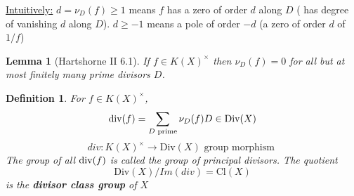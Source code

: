 \documentclass[11pt]{article}
\newtheorem{lemma}[thm]{Lemma}
\newtheorem{dfn}[thm]{Definition}
\renewcommand{\div}{\textnormal{div}}
\newcommand{\lrta}{\longrightarrow}
\begin{document}
\underline{Intuitively:}
$d=\nu_D(f)\geq 1$ means $f$ has a zero of order $d$ along $D$ ( has degree of vanishing $d$ along $D$). $d\geq -1$ means a pole of order $-d$ (a zero of order $d$ of $1/f$)



\begin{lemma}[Hartshorne II 6.1] If $f\in K(X)^\times$ then $\nu_D(f)=0$ for all but at most finitely many prime divisors $D$.
\end{lemma}
\begin{dfn}
For 
$f\in K(X)^\times$,
$$
\div(f)=\sum_{D\text{ prime}} \nu_D(f) D \in \text{Div}(X)
$$
$$
div:K(X)^\times\lrta \text{Div}(X)\text{ group morphism }
$$
The group of all $\div(f) $ is called the group of principal divisors. The quotient
$$
\text{Div}(X)/Im(div)=\text{Cl}(X)
$$
is the \textbf{divisor class group } of $X$
\end{dfn}
\end{document}
